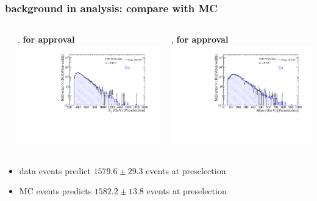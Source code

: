 \documentclass[bigger]{beamer}
\providecommand{\alert}[1]{\textbf{#1}}
\begin{document}
\begin{frame}
\frametitle{\ttbar background in \eejj analysis: compare with MC}
\label{sec-2-2-5}
\begin{columns} %
\label{sec-2-2-5-1}
\begin{column}{0.6\textwidth}
\label{sec-2-2-5-1-1}

\centering
\ST, \alert{for approval}
\includegraphics[width=\textwidth]{fig/emu/preselection_noRatio/sT_PAS_emujj.pdf}
\end{column}
\begin{column}{0.6\textwidth}
\label{sec-2-2-5-1-2}

\centering
\mee, \alert{for approval}
\includegraphics[width=\textwidth]{fig/emu/preselection_noRatio/Mee_PAS_emujj.pdf}
\end{column}
\end{columns}
\label{sec-2-2-5-2}

\begin{itemize}
\footnotesize
\item \emujj data events predict $1579.6 \pm 29.3$ \ttbar events at preselection
\item \eejj MC events predicts $1582.2 \pm 13.8$ \ttbar events at preselection
\end{itemize}
\end{frame}
\end{document}
